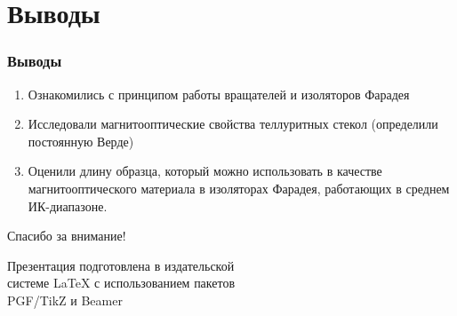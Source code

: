 \documentclass[10pt,pdf,hyperref={unicode}, dvipsnames]{beamer}
\begin{document}
\section{Выводы}
\begin{frame}
	\frametitle{Выводы}
	\begin{enumerate} 
		\item 
			  Ознакомились с принципом работы вращателей и изоляторов Фарадея
		\item 
		      Исследовали магнитооптические свойства теллуритных стекол (определили постоянную Верде)
		\item 
		      Оценили длину образца, который можно использовать в качестве магнитооптического материала в изоляторах Фарадея, работающих в среднем ИК-диапазоне.
	\end{enumerate}
\end{frame}


\begin{frame}[plain]
	\vspace{4cm}
	\begin{center}
		\Huge
		Спасибо за внимание!
	\end{center}
	\vspace{2.5cm}
	\begin{center}
		\color{black!30!white}
		Презентация подготовлена в издательской \\
		системе LaTeX с использованием пакетов \\
		PGF/TikZ и Beamer
	\end{center}
\end{frame}

\end{document}
